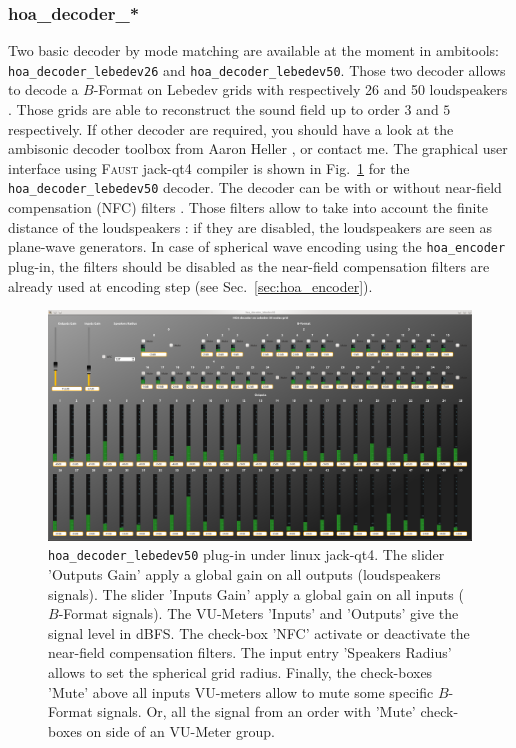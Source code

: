 \documentclass[10pt,a4paper]{article}
\begin{document}
\subsubsection{hoa\_decoder\_*}
Two basic decoder by mode matching \cite{daniel2000representation,poletti2005three} are available at the moment in ambitools: \lstinline'hoa_decoder_lebedev26' and
\lstinline'hoa_decoder_lebedev50'. Those two decoder allows to decode a $B$-Format on Lebedev grids with respectively 26 and 50 loudspeakers \cite{lebedev1975values,lecomte2015on}. Those grids are able to reconstruct the sound field up to order $3$ and $5$ respectively.
If other decoder are required, you should have a look at the ambisonic decoder toolbox from Aaron Heller \cite{heller2012toolkit}, or contact me. The graphical user interface using \textsc{Faust} jack-qt4 compiler is shown in Fig.~\ref{fig:hoa_decoder_lebedev50} for the \lstinline'hoa_decoder_lebedev50' decoder. The decoder can be with or without near-field compensation (NFC) filters \cite{daniel2003further,lecomte2015real}. Those filters allow to take into account the finite distance of the loudspeakers : if they are disabled, the loudspeakers are seen as plane-wave generators. In case of spherical wave encoding using the \lstinline'hoa_encoder' plug-in, the filters should be disabled as the near-field compensation filters are already used at encoding step (see Sec.~\ref{sec:hoa_encoder}).
\begin{figure}[!ht]
\includegraphics[width=\columnwidth]{hoa_decoder_lebedev50.png}
\caption{\lstinline'hoa_decoder_lebedev50' plug-in under linux jack-qt4. The slider 'Outputs Gain' apply a global gain on all outputs (loudspeakers signals). The slider 'Inputs Gain' apply a global gain on all inputs ($B$-Format signals). The VU-Meters 'Inputs' and 'Outputs' give the signal level in dBFS. The check-box 'NFC' activate or deactivate the near-field compensation filters. The input entry 'Speakers Radius' allows to set the spherical grid radius. Finally, the check-boxes 'Mute' above all inputs VU-meters allow to mute some specific $B$-Format signals. Or, all the signal from an order with 'Mute' check-boxes on side of an VU-Meter group.}
\label{fig:hoa_decoder_lebedev50}
\end{figure}
\end{document}

